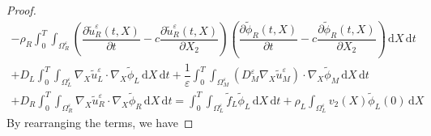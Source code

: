 \documentclass[11pt]{article}
\def\es{\varepsilon}
\def\orr{\Omega_R^\varepsilon}
\def\omm{\Omega_M^\varepsilon}
\def\oll{\Omega_L^\varepsilon}
\newcommand{\di}[1]{\,\mathrm{d}#1}
\begin{document}
\begin{proof}
\begin{multline*}
      -\rho_R\int_0^T\int_{\orr} \left(\dfrac{\partial \widetilde{u}_{R}^\es(t,X)}{\partial t}-c\dfrac{\partial \widetilde{u}_{R}^\es(t,X)}{\partial{X_2}}\right)\left(\dfrac{\partial \widetilde{\phi}_{R}(t,X)}{\partial t}-c\dfrac{\partial \widetilde{\phi}_{R}(t,X)}{\partial{X_2}}\right)\di{X\di{t}}\\
       +D_L\int_0^T\int_{\oll}\nabla_X \widetilde{u}_L^\es\cdot\nabla_X  \widetilde{\phi}_L \di{X}\di{t}+\dfrac{1}{\es}\int_0^T\int_{\omm}\left({D}_M^\es \nabla_X \widetilde{u}_M^\es\right)\cdot\nabla_X  \widetilde{\phi}_M\di{X}\di{t}\\
        +D_R\int_0^T\int_{\orr} \nabla_X \widetilde{u}_R^\es\cdot\nabla_X  \widetilde{\phi}_R \di{X}\di{t}=\int_0^T\int_{\oll}\widetilde{f}_L \widetilde{\phi}_L\di{X}\di{t}+\rho_L\int_{\oll}v_2(X)\widetilde{\phi}_L(0)\di{X}
\end{multline*}
By rearranging the terms, we have


\end{proof}
\end{document}
